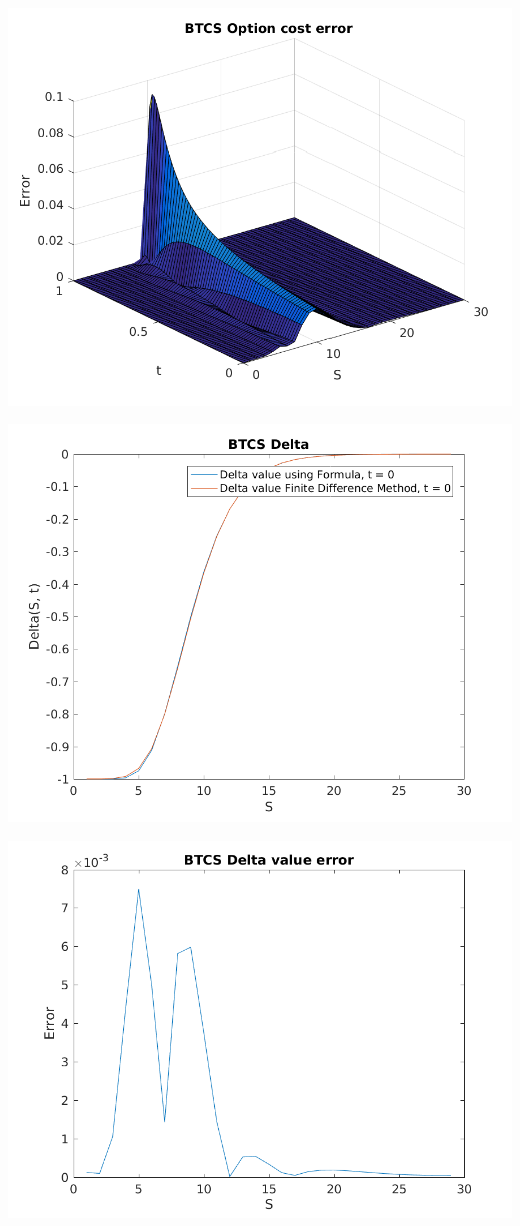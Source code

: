 \documentclass{article}
\begin{document}
\includegraphics{"q2_16"}
\pagebreak


\includegraphics{"q2_17"}
\pagebreak


\includegraphics{"q2_18"}
\pagebreak
\end{document}
